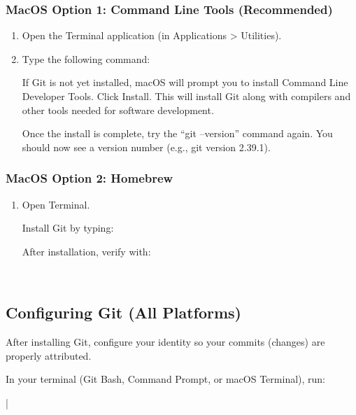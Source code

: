 \subsubsection{MacOS Option 1: Command Line Tools (Recommended)}
\begin{enumerate}
\item Open the Terminal application (in Applications > Utilities).
\item Type the following command:
\begin{terminal}
\end{terminal}

If Git is not yet installed, macOS will prompt you to install Command Line Developer Tools. Click Install.
This will install Git along with compilers and other tools needed for software development.

Once the install is complete, try the ``git --version'' command again. You should now see a version number (e.g., git version 2.39.1).
\end{enumerate}

\subsubsection{MacOS Option 2: Homebrew}
\begin{enumerate}
\item Open Terminal.

Install Git by typing:
\begin{terminal}
\end{terminal}

After installation, verify with:
\begin{terminal}
\\
\end{terminal}
\end{enumerate}

\subsection*{Configuring Git (All Platforms)}
After installing Git, configure your identity so your commits (changes) are properly attributed.

In your terminal (Git Bash, Command Prompt, or macOS Terminal), run:
\begin{terminal}
|\\
\end{terminal}

